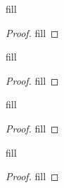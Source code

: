 \begin{exercise}{46}
fill
\end{exercise}
\begin{proof}
fill
\end{proof} 

\begin{exercise}{47}
fill
\end{exercise}
\begin{proof}
fill
\end{proof} 

\begin{exercise}{48}
fill
\end{exercise}
\begin{proof}
fill
\end{proof} 

\begin{exercise}{49}
fill
\end{exercise}
\begin{proof}
fill
\end{proof} 